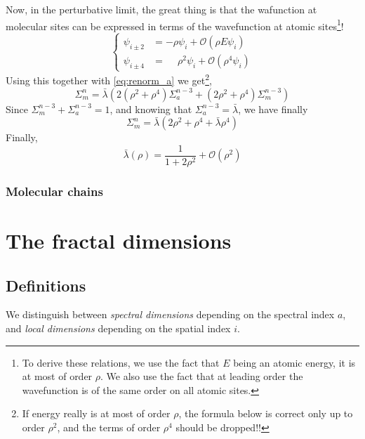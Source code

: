 \documentclass[11pt]{article}
\begin{document}
Now, in the perturbative limit, the great thing is that the wafunction at molecular sites can be expressed in terms of the wavefunction at atomic sites\footnote{To derive these relations, we use the fact that $E$ being an atomic energy, it is at most of order $\rho$. We also use the fact that at leading order the wavefunction is of the same order on all atomic sites.}! 
\begin{equation}
	\begin{cases}
	\psi_{i\pm2} &= - \rho \psi_i + \mathcal{O}(\rho E \psi_i) \\
	\psi_{i\pm4} &= \phantom{-}\rho^2 \psi_i  + \mathcal{O}(\rho^4 \psi_i)
	\end{cases}
\end{equation}
Using this together with \eqref{eq:renorm_a} we get\footnote{If energy really is at most of order $\rho$, the formula below is correct only up to order $\rho^2$, and the terms of order $\rho^4$ should be dropped!!},
\begin{equation}
	\Sigma_m^n = \bar \lambda \left( 2(\rho^2 + \rho^4) \Sigma_a^{n-3} + (2 \rho^2 + \rho^4) \Sigma_m^{n-3} \right)
\end{equation}
Since $\Sigma_m^{n-3} + \Sigma_a^{n-3} = 1$, and knowing that $\Sigma_a^{n-3} = \bar \lambda$, we have finally
\begin{equation}
\boxed{
	\Sigma_m^n = \bar \lambda \left( 2 \rho^2 + \rho^4 + \bar \lambda \rho^4 \right)
}
\end{equation}
Finally,
\begin{equation}
\boxed{
	\bar \lambda(\rho) = \frac{1}{1+2\rho^2} +\mathcal{O}(\rho^2)
}
\end{equation}
\subsubsection{Molecular chains}

\section{The fractal dimensions}

\subsection{Definitions}

We distinguish between \emph{spectral dimensions} depending on the spectral index $a$, and \emph{local dimensions} depending on the spatial index $i$.
\end{document}
